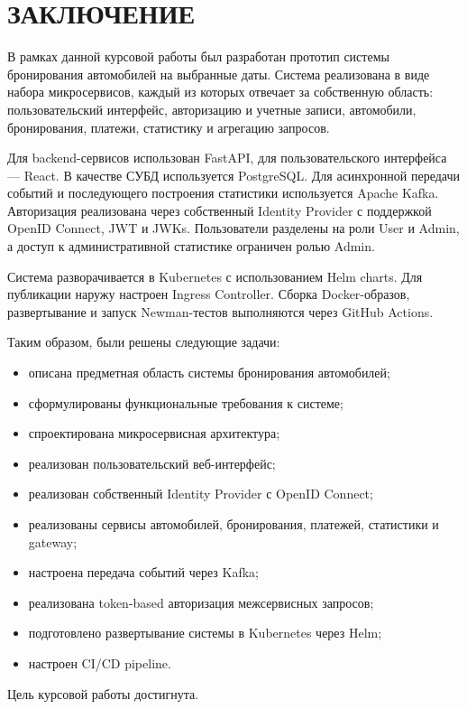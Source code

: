 \chapter*{ЗАКЛЮЧЕНИЕ}

В рамках данной курсовой работы был разработан прототип системы бронирования автомобилей на выбранные даты. Система реализована в виде набора микросервисов, каждый из которых отвечает за собственную область: пользовательский интерфейс, авторизацию и учетные записи, автомобили, бронирования, платежи, статистику и агрегацию запросов.

Для backend-сервисов использован FastAPI, для пользовательского интерфейса --- React. В качестве СУБД используется PostgreSQL. Для асинхронной передачи событий и последующего построения статистики используется Apache Kafka. Авторизация реализована через собственный Identity Provider с поддержкой OpenID Connect, JWT и JWKs. Пользователи разделены на роли User и Admin, а доступ к административной статистике ограничен ролью Admin.

Система разворачивается в Kubernetes с использованием Helm charts. Для публикации наружу настроен Ingress Controller. Сборка Docker-образов, развертывание и запуск Newman-тестов выполняются через GitHub Actions.

Таким образом, были решены следующие задачи:

\begin{itemize}
  \item описана предметная область системы бронирования автомобилей;
  \item сформулированы функциональные требования к системе;
  \item спроектирована микросервисная архитектура;
  \item реализован пользовательский веб-интерфейс;
  \item реализован собственный Identity Provider с OpenID Connect;
  \item реализованы сервисы автомобилей, бронирования, платежей, статистики и gateway;
  \item настроена передача событий через Kafka;
  \item реализована token-based авторизация межсервисных запросов;
  \item подготовлено развертывание системы в Kubernetes через Helm;
  \item настроен CI/CD pipeline.
\end{itemize}

Цель курсовой работы достигнута.
